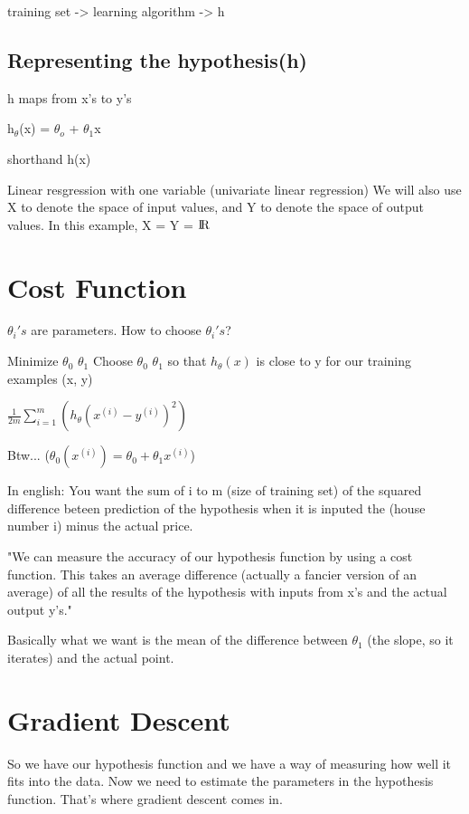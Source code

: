 \documentclass{article}
\begin{document}
    training set -> learning algorithm -> h
    \subsection{Representing the hypothesis(h)}
    h maps from x's to y's

    h$_\theta$(x) = $\theta_o$ + $\theta_1$x

    shorthand h(x)

    Linear resgression with one variable (univariate linear regression)
    We will also use X to denote the space of input values, and Y to denote the
    space of output values. In this example, X = Y = ${\rm I\!R}$\\

    \section{Cost Function}
    $\theta_i's$ are parameters.
    How to choose $\theta_i's$?


    Minimize $\theta_0$ $\theta_1$
    Choose $\theta_0$ $\theta_1$ so that $h_\theta(x)$ is close to y for our
    training examples (x, y)



    $\frac{1}{2m}\sum_{i=1}^{m}(h_\theta(x^(i) - y^(i))^2)$


    Btw...  ($\theta_0(x^(i)) = \theta_0 + \theta_1x^(i)$)


    In english:
    You want the sum of i to m (size of training set) of the squared
    difference beteen prediction of the hypothesis when it is inputed the
    (house number i) minus the actual price.


    "We can measure the accuracy of our hypothesis function by using a cost
    function. This takes an average difference (actually a fancier version of
    an average) of all the results of the hypothesis with inputs from x's and
    the actual output y's."

    Basically what we want is the mean of the difference between $\theta_1$
    (the slope, so it iterates) and the actual point.

    \section{Gradient Descent}
    So we have our hypothesis function and we have a way of measuring how well
    it fits into the data. Now we need to estimate the parameters in the
    hypothesis function. That's where gradient descent comes in.
\end{document}
